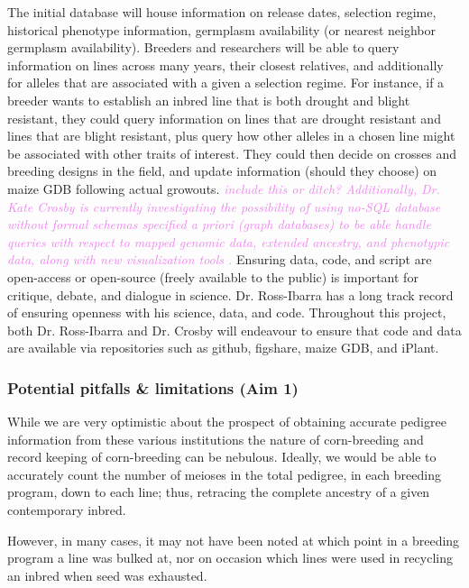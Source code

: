 \documentclass[12pt]{article}
\newcommand{\kc}[1]{\textcolor{violet}{ \emph{\scriptsize  #1}} }
\begin{document}
The initial database will house information on release dates, selection regime, historical phenotype information, germplasm availability (or nearest neighbor germplasm availability).
Breeders and researchers will be able to query information on lines across many years, their closest relatives, and additionally for alleles that are associated with a given a selection regime. 
For instance, if a breeder wants to establish an inbred line that is both drought and blight resistant, they could query information on lines that are drought resistant and lines that are blight resistant, plus query how other alleles in a chosen line might be associated with other traits of interest. They could then decide on crosses and breeding designs in the field, and update information (should they choose) on maize GDB following actual growouts.
\kc{include this or ditch? Additionally, Dr. Kate Crosby is currently investigating the possibility of using no-SQL database without formal schemas specified \textit{a priori} (graph databases) to be able handle queries with respect to mapped genomic data, extended ancestry, and phenotypic data, along with new visualization tools \citep{ParejaTobes:2015bf}.}
Ensuring data, code, and script are open-access or open-source (freely available to the public) is important for critique, debate, and dialogue in science. Dr. Ross-Ibarra has a long track record of ensuring openness with his science, data, and code. Throughout this project, both Dr. Ross-Ibarra and Dr. Crosby will endeavour to ensure that code and data are available via repositories such as github, figshare, maize GDB, and iPlant.



\subsubsection*{Potential pitfalls \& limitations (Aim 1)}
While we are very optimistic about the prospect of obtaining accurate pedigree information from these various institutions the nature of corn-breeding and record keeping of corn-breeding can be nebulous. 
Ideally, we would be able to accurately count the number of meioses in the total pedigree, in each breeding program, down to each line; thus, retracing the complete ancestry of a given contemporary inbred. 

However, in many cases, it may not have been noted at which point in a breeding program a line was bulked at, nor on occasion which lines were used in recycling an inbred when seed was exhausted. 
\end{document}
